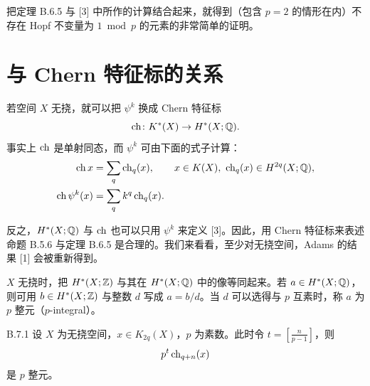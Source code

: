 
\begin{remark}{}
  把定理 B.6.5 与 [3] 中所作的计算结合起来，就得到（包含 $p=2$ 的情形在内）不存在 Hopf 不变量为 $1\bmod p$ 的元素的非常简单的证明。
\end{remark}

\section{与 Chern 特征标的关系}

若空间 $X$ 无挠，就可以把 $\psi^k$ 换成 Chern 特征标
\[
  \operatorname{ch}\colon K^*(X)\to H^*(X;\mathbb{Q}).
\]
事实上 $\operatorname{ch}$ 是单射同态，而 $\psi^k$ 可由下面的式子计算：
\begin{align*}
  \operatorname{ch} x&=\sum_q\operatorname{ch}_q(x),\qquad x\in K(X),\ \operatorname{ch}_q(x)\in H^{2q}(X;\mathbb{Q}),\\
  \operatorname{ch}\psi^k(x)&=\sum_qk^q\operatorname{ch}_q(x).
\end{align*}

反之，$H^*(X;\mathbb{Q})$ 与 $\operatorname{ch}$ 也可以只用 $\psi^k$ 来定义 [3]。因此，用 Chern 特征标来表述命题 B.5.6 与定理 B.6.5 是合理的。我们来看看，至少对无挠空间，Adams 的结果 [1] 会被重新得到。

$X$ 无挠时，把 $H^*(X;\mathbb{Z})$ 与其在 $H^*(X;\mathbb{Q})$ 中的像等同起来。若 $a\in H^*(X;\mathbb{Q})$，则可用 $b\in H^*(X;\mathbb{Z})$ 与整数 $d$ 写成 $a=b/d$。当 $d$ 可以选得与 $p$ 互素时，称 $a$ 为 $p$ 整元（$p$-integral）。

\begin{theorem*}{B.7.1}
  设 $X$ 为无挠空间，$x\in K_{2q}(X)$，$p$ 为素数。此时令 $t=\left[\frac{n}{p-1}\right]$，则
  \[
    p^t\operatorname{ch}_{q+n}(x)
  \]
  是 $p$ 整元。
\end{theorem*}

